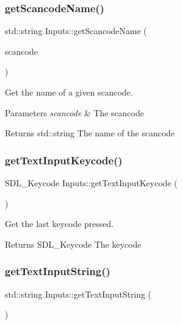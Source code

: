 \subsubsection{\texorpdfstring{get\+Scancode\+Name()}{getScancodeName()}}
{\footnotesize\ttfamily std\+::string Inputs\+::get\+Scancode\+Name (\begin{DoxyParamCaption}\item[{S\+D\+L\+\_\+\+Scancode}]{scancode }\end{DoxyParamCaption})\hspace{0.3cm}{\ttfamily [static]}}



Get the name of a given scancode. 


\begin{DoxyParams}{Parameters}
{\em scancode} & The scancode \\
\hline
\end{DoxyParams}
\begin{DoxyReturn}{Returns}
std\+::string The name of the scancode 
\end{DoxyReturn}
\mbox{\label{class_inputs_a6f07ed05a776562c7bf5e6a011b1ecfb}} 
\subsubsection{\texorpdfstring{get\+Text\+Input\+Keycode()}{getTextInputKeycode()}}
{\footnotesize\ttfamily S\+D\+L\+\_\+\+Keycode Inputs\+::get\+Text\+Input\+Keycode (\begin{DoxyParamCaption}{ }\end{DoxyParamCaption})\hspace{0.3cm}{\ttfamily [static]}}



Get the last keycode pressed. 

\begin{DoxyReturn}{Returns}
S\+D\+L\+\_\+\+Keycode The keycode 
\end{DoxyReturn}
\mbox{\label{class_inputs_aa87c9c60ec70181c57e93fa8c671291d}} 
\subsubsection{\texorpdfstring{get\+Text\+Input\+String()}{getTextInputString()}}
{\footnotesize\ttfamily std\+::string Inputs\+::get\+Text\+Input\+String (\begin{DoxyParamCaption}{ }\end{DoxyParamCaption})\hspace{0.3cm}{\ttfamily [static]}}



